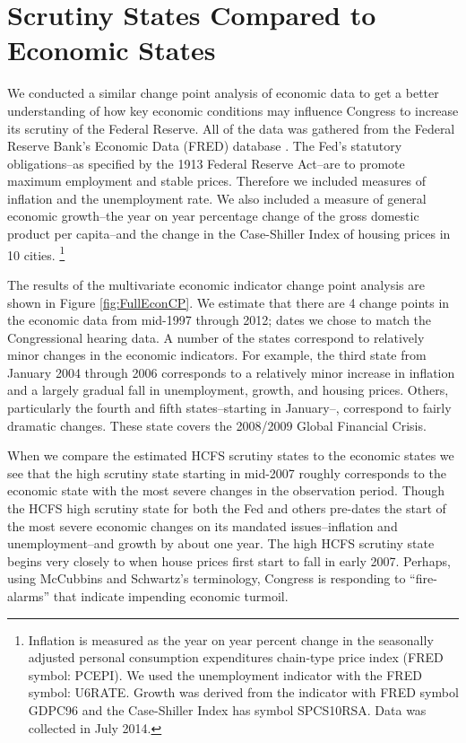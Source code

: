 \documentclass[a4paper]{article}\usepackage[]{graphicx}\usepackage[]{color}
\begin{document}
\section{Scrutiny States Compared to Economic States}

We conducted a similar change point analysis of economic data to get a better understanding of how key economic conditions may influence Congress to increase its scrutiny of the Federal Reserve. All of the data was gathered from the Federal Reserve Bank's Economic Data (FRED) database \citep{FRED}. The Fed's statutory obligations--as specified by the 1913 Federal Reserve Act--are to promote maximum employment and stable prices. Therefore we included measures of inflation and the unemployment rate. We also included a measure of general economic growth--the year on year percentage change of the gross domestic product per capita--and the change in the Case-Shiller Index of housing prices in 10 cities. \footnote{Inflation is measured as the year on year percent change in the seasonally adjusted personal consumption expenditures chain-type price index (FRED symbol: PCEPI). We used the unemployment indicator with the FRED symbol: U6RATE. Growth was derived from the indicator with FRED symbol GDPC96 and the Case-Shiller Index has symbol SPCS10RSA. Data was collected in July 2014.}

The results of the multivariate economic indicator change point analysis are shown in Figure \ref{fig:FullEconCP}. We estimate that there are 4 change points in the economic data from mid-1997 through 2012; dates we chose to match the Congressional hearing data. A number of the states correspond to relatively minor changes in the economic indicators. For example, the third state from January 2004 through 2006 corresponds to a relatively minor increase in inflation and a largely gradual fall in unemployment, growth, and housing prices. Others, particularly the fourth and fifth states--starting in January--, correspond to fairly dramatic changes. These state covers the 2008/2009 Global Financial Crisis.

When we compare the estimated HCFS scrutiny states to the economic states we see that the high scrutiny state starting in mid-2007 roughly corresponds to the economic state with the most severe changes in the observation period. Though the HCFS high scrutiny state for both the Fed and others pre-dates the start of the most severe economic changes on its mandated issues--inflation and unemployment--and growth by about one year. The high HCFS scrutiny state begins very closely to when house prices first start to fall in early 2007.  Perhaps, using McCubbins and Schwartz's \citeyearpar{Mccubbins1984} terminology, Congress is responding to ``fire-alarms'' that indicate impending economic turmoil.
\end{document}

